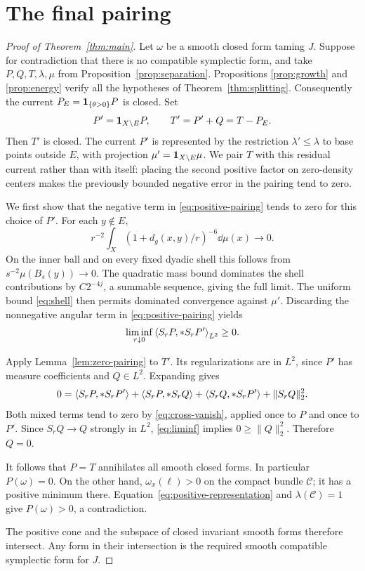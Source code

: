\section{The final pairing}\label{sec:conclusion}

\begin{proof}[Proof of Theorem~\ref{thm:main}]
Let \(\omega\) be a smooth closed form taming \(J\).
Suppose for contradiction that there is no compatible
symplectic form, and take \(P,Q,T,\lambda,\mu\) from
Proposition~\ref{prop:separation}. Propositions
\ref{prop:growth} and \ref{prop:energy} verify all the
hypotheses of Theorem~\ref{thm:splitting}.
Consequently the current \(P_E=\mathbf 1_{\{\theta>0\}}P\)
is closed. Set
\[
P'=\mathbf 1_{X\setminus E}P,\qquad
T'=P'+Q=T-P_E.
\]
Then \(T'\) is closed. The current \(P'\) is represented
by the restriction \(\lambda'\le\lambda\) to base points
outside \(E\), with projection
\(\mu'=\mathbf 1_{X\setminus E}\mu\).
We pair \(T\) with this residual current rather than with itself:
placing the second positive factor on zero-density centers makes
the previously bounded negative error in the pairing tend to zero.

We first show that the negative term in
\eqref{eq:positive-pairing} tends to zero for this
choice of \(P'\). For each \(y\notin E\),
\begin{equation}\label{eq:zero-density-tail}
r^{-2}\int_X(1+d_g(x,y)/r)^{-6}\dd\mu(x)
\longrightarrow0.
\end{equation}
On the inner ball and on every fixed dyadic shell this
follows from \(s^{-2}\mu(B_s(y))\to0\).
The quadratic mass bound dominates the shell contributions
by \(C2^{-4j}\), a summable sequence, giving the full
limit. The uniform bound \eqref{eq:shell} then permits
dominated convergence against \(\mu'\).
Discarding the nonnegative angular term in
\eqref{eq:positive-pairing} yields
\begin{equation}\label{eq:liminf}
\liminf_{r\downarrow0}\left\langle S_rP,*S_rP'\right\rangle_{L^2}\ge0.
\end{equation}

Apply Lemma~\ref{lem:zero-pairing} to \(T'\).
Its regularizations are in \(L^2\), since \(P'\) has
measure coefficients and \(Q\in L^2\).
Expanding gives
\[
0=\left\langle S_rP,*S_rP'\right\rangle
+\left\langle S_rP,*S_rQ\right\rangle
+\left\langle S_rQ,*S_rP'\right\rangle
+\|S_rQ\|_2^2.
\]
Both mixed terms tend to zero by
\eqref{eq:cross-vanish}, applied once to \(P\) and once
to \(P'\). Since \(S_rQ\to Q\) strongly in \(L^2\),
\eqref{eq:liminf} implies \(0\ge\|Q\|_2^2\).
Therefore \(Q=0\).

It follows that \(P=T\) annihilates all smooth closed
forms. In particular \(P(\omega)=0\). On the other
hand, \(\omega_x(\ell)>0\) on the compact bundle
\(\mathscr C\); it has a positive minimum there.
Equation~\eqref{eq:positive-representation} and
\(\lambda(\mathscr C)=1\) give \(P(\omega)>0\),
a contradiction.

The positive cone and the subspace of closed invariant
smooth forms therefore intersect. Any form in their
intersection is the required smooth compatible
symplectic form for \(J\).
\end{proof}
